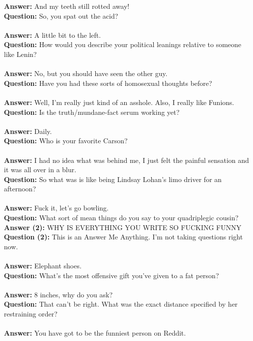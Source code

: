 \documentclass[a4paper]{article}
\begin{document}
\textbf{Answer:} And my teeth still rotted away! \\
\textbf{Question:} So, you spat out the acid? \\ \\
\textbf{Answer:} A little bit to the left. \\
\textbf{Question:} How would you describe your political leanings relative to someone like Lenin? \\ \\
\textbf{Answer:} No, but you should have seen the other guy. \\
\textbf{Question:} Have you had these sorts of homosexual thoughts before? \\ \\
\textbf{Answer:} Well, I'm really just kind of an asshole. Also, I really like Funions. \\
\textbf{Question:} Is the truth/mundane-fact serum working yet? \\ \\
\textbf{Answer:} Daily. \\
\textbf{Question:} Who is your favorite Carson? \\ \\
\textbf{Answer:} I had no idea what was behind me, I just felt the painful sensation and it was all over in a blur. \\
\textbf{Question:} So what was is like being Lindsay Lohan's limo driver for an afternoon? \\ \\
\textbf{Answer:} Fuck it, let's go bowling. \\
\textbf{Question:} What sort of mean things do you say to your quadriplegic cousin? \\
\textbf{Answer (2):} WHY IS EVERYTHING YOU WRITE SO FUCKING FUNNY \\
\textbf{Question (2):} This is an Answer Me Anything. I'm not taking questions right now. \\ \\
\textbf{Answer:} Elephant shoes. \\
\textbf{Question:} What's the most offensive gift you've given to a fat person? \\ \\
\textbf{Answer:} 8 inches, why do you ask? \\
\textbf{Question:} That can't be right. What was the exact distance specified by her restraining order? \\ \\
\textbf{Answer:} You have got to be the funniest person on Reddit. \\
\end{document}
